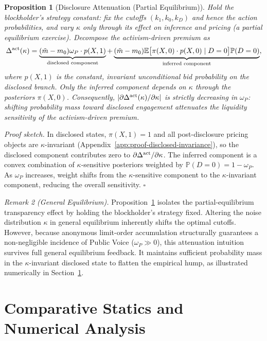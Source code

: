 \documentclass[11pt]{article}
\newtheorem{proposition}{Proposition}
\newcommand{\E}{\mathbb{E}}
\newcommand{\PP}{\mathbb{P}}
\newcommand{\1}{\mathbf{1}}
\begin{document}
\begin{proposition}[Disclosure Attenuation (Partial Equilibrium)]
\label{prop:disclosure-attenuation}
Hold the blockholder's strategy constant: fix the cutoffs $(k_1,k_0,k_D)$ and hence the action probabilities, and vary $\kappa$ only through its effect on inference and pricing (a partial equilibrium exercise). Decompose the activism-driven premium as
\[
\Delta^{\textup{act}}(\kappa) = \underbrace{(\tilde{m}-m_0)\omega_P \cdot p(X,1)}_{\text{disclosed component}} + \underbrace{(\tilde{m}-m_0)\E\big[\pi(X,0)\cdot p(X,0) \mid D=0\big]\PP(D=0)}_{\text{inferred component}},
\]
where $p(X,1)$ is the constant, invariant unconditional bid probability on the disclosed branch. Only the inferred component depends on $\kappa$ through the posteriors $\pi(X,0)$. Consequently, $|\partial \Delta^{\textup{act}}(\kappa)/\partial\kappa|$ is strictly decreasing in $\omega_P$: shifting probability mass toward disclosed engagement attenuates the liquidity sensitivity of the activism-driven premium.
\end{proposition}

\textit{Proof sketch.} In disclosed states, $\pi(X,1)=1$ and all post-disclosure pricing objects are $\kappa$-invariant (Appendix~\ref{app:proof-disclosed-invariance}), so the disclosed component contributes zero to $\partial\Delta^{\textup{act}}/\partial\kappa$. The inferred component is a convex combination of $\kappa$-sensitive posteriors weighted by $\PP(D=0)=1-\omega_P$. As $\omega_P$ increases, weight shifts from the $\kappa$-sensitive component to the $\kappa$-invariant component, reducing the overall sensitivity. \hfill$\square$

\emph{Remark 2 (General Equilibrium).} Proposition~\ref{prop:disclosure-attenuation} isolates the partial-equilibrium transparency effect by holding the blockholder's strategy fixed. Altering the noise distribution $\kappa$ in general equilibrium inherently shifts the optimal cutoffs. However, because anonymous limit-order accumulation structurally guarantees a non-negligible incidence of Public Voice ($\omega_P \gg 0$), this attenuation intuition survives full general equilibrium feedback. It maintains sufficient probability mass in the $\kappa$-invariant disclosed state to flatten the empirical hump, as illustrated numerically in Section~\ref{sec:numerical}.

\section{Comparative Statics and Numerical Analysis}
\label{sec:numerical}
\label{sec:comp-statics}
\end{document}
